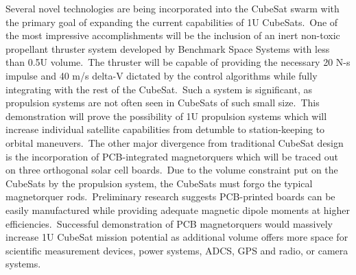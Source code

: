 Several novel technologies are being incorporated into the CubeSat
swarm with the primary goal of expanding the current capabilities of
1U CubeSats. One of the most impressive accomplishments will be the
inclusion of an inert non-toxic propellant thruster system developed
by Benchmark Space Systems with less than 0.5U volume. The thruster
will be capable of providing the necessary 20 N-s impulse and 40 m/s
delta-V dictated by the control algorithms while fully integrating
with the rest of the CubeSat. Such a system is significant, as
propulsion systems are not often seen in CubeSats of such small size. This demonstration will prove the possibility of 1U propulsion systems
which will increase individual satellite capabilities from detumble to
station-keeping to orbital maneuvers. The other major divergence from
traditional CubeSat design is the incorporation of PCB-integrated
magnetorquers which will be traced out on three orthogonal solar cell
boards. Due to the volume constraint put on the CubeSats by the
propulsion system, the CubeSats must forgo the typical magnetorquer
rods. Preliminary research suggests PCB-printed boards can be easily
manufactured while providing adequate magnetic dipole moments at
higher efficiencies. Successful demonstration of PCB magnetorquers
would massively increase 1U CubeSat mission potential as additional
volume offers more space for scientific measurement devices, power
systems, ADCS, GPS and radio, or camera systems.
